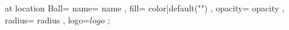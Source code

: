 \pic[shift={ {{- offset -}} }] at {{ location }} {
    Ball={
        name={{ name }},
        fill={{ color|default("\SumColor") }},
        opacity={{ opacity }},
        radius={{ radius }},
        logo=${{ logo }}$
    }
};
